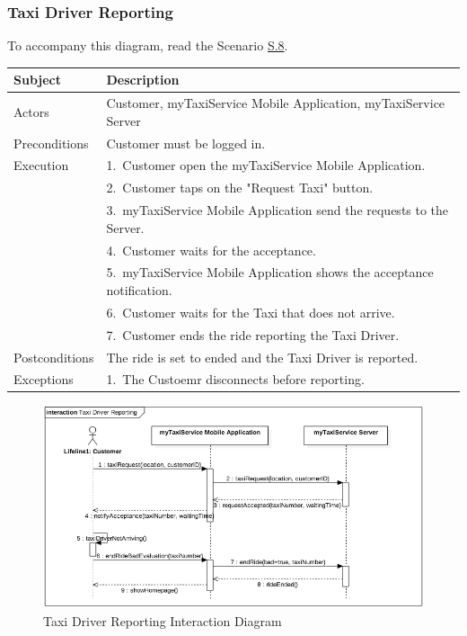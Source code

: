 \subsubsection{Taxi Driver Reporting}
			To accompany this diagram, read the Scenario \hyperref[sec:TaxiDriverReportingScenario]{S.8}.

				\begin{table}[htpb]
					\centering
					\label{tab:TaxiDriverReportingDiagramTable}
					\begin{tabularx}{\textwidth}{lp{9cm}}
						\hline
						\hline
							\textbf{Subject}
						& 
							\textbf{Description}\\
						\hline
							Actors	       &  Customer, myTaxiService Mobile Application, myTaxiService Server\\
						\hline
							Preconditions  &  Customer must be logged in.\\
						\hline
							Execution      &  1.~Customer open the myTaxiService Mobile Application.\\
										   &  2.~Customer taps on the "Request Taxi" button.\\
										   &  3.~myTaxiService Mobile Application send the requests to the Server.\\
										   &  4.~Customer waits for the acceptance.\\
										   &  5.~myTaxiService Mobile Application shows the acceptance notification.\\
										   &  6.~Customer waits for the Taxi that does not arrive.\\
										   &  7.~Customer ends the ride reporting the Taxi Driver.\\
						\hline
							Postconditions &  The ride is set to ended and the Taxi Driver is reported.\\
						\hline
							Exceptions     &  1.~The Custoemr disconnects before reporting.\\
									
						\hline
						\hline
					\end{tabularx}
				\end{table}
				
				\begin{figure}[H]
					\centering
					\includegraphics[width=\textwidth, scale=0.5]{IMG/InteractionDiagrams/TaxiDriverReporting.png}
					\caption{Taxi Driver Reporting Interaction Diagram}\label{sec:FigureTaxiDriverReporting}
				\end{figure}